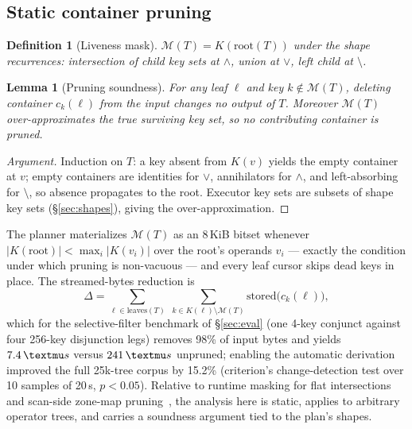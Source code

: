 \documentclass[sigconf,nonacm]{acmart}
\newcommand{\us}{\,\textmu s}
\newcommand{\stored}{\ensuremath{\mathrm{stored}}}
\newcommand{\mask}{\ensuremath{\mathcal{M}}}
\newtheorem{lemmax}{Lemma}
\newtheorem{defx}{Definition}
\begin{document}
\subsection{Static container pruning}
\label{sec:holepunch}

\begin{defx}[Liveness mask]
$\mask(T) = K(\mathrm{root}(T))$ under the shape recurrences:
intersection of child key sets at $\wedge$, union at $\vee$, left child
at $\setminus$.
\end{defx}

\begin{lemmax}[Pruning soundness]
\label{lem:mask}
For any leaf $\ell$ and key $k \notin \mask(T)$, deleting container
$c_k(\ell)$ from the input changes no output of $T$. Moreover
$\mask(T)$ over-approximates the true surviving key set, so no
contributing container is pruned.
\end{lemmax}

\begin{proof}[Argument]
Induction on $T$: a key absent from $K(v)$ yields the empty container at
$v$; empty containers are identities for $\vee$, annihilators for
$\wedge$, and left-absorbing for $\setminus$, so absence propagates to
the root. Executor key sets are subsets of shape key sets
(\S\ref{sec:shapes}), giving the over-approximation.
\end{proof}

The planner materializes $\mask(T)$ as an 8\,KiB bitset whenever
$|K(\mathrm{root})| < \max_i |K(v_i)|$ over the root's operands $v_i$
--- exactly the condition under
which pruning is non-vacuous --- and every leaf cursor skips dead keys
in place. The streamed-bytes reduction is
\begin{equation}
\Delta = \sum_{\ell \in \mathrm{leaves}(T)}\;
\sum_{k \in K(\ell)\setminus\mask(T)} \stored\big(c_k(\ell)\big),
\end{equation}
which for the selective-filter benchmark of \S\ref{sec:eval} (one
4-key conjunct against four 256-key disjunction legs) removes 98\% of
input bytes and yields $7.4\us$ versus $241\us$ unpruned; enabling the
automatic derivation improved the full 25k-tree corpus by 15.2\%
(criterion's change-detection test over 10 samples of 20\,s,
$p < 0.05$). Relative to runtime masking for flat
intersections~\cite{roaringjava} and scan-side zone-map
pruning~\cite{moerkotte1998,snowflake2016}, the analysis here is static,
applies to arbitrary operator trees, and carries a soundness argument
tied to the plan's shapes.
\end{document}
